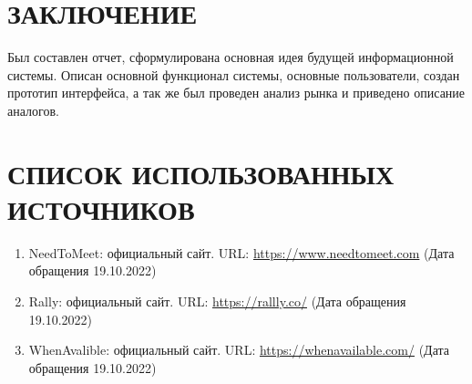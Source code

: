 \documentclass[14pt]{extreport}
\begin{document}
\chapter{ЗАКЛЮЧЕНИЕ \label{chapter3}}
Был составлен отчет, сформулирована основная идея будущей информационной системы. Описан основной функционал системы, основные пользователи, создан прототип интерфейса, а так же был проведен анализ рынка и приведено описание аналогов.
\chapter{СПИСОК ИСПОЛЬЗОВАННЫХ ИСТОЧНИКОВ \label{chapter4}}
\begin{enumerate}
    \item \label{a:NeetToMeet} NeedToMeet: официальный сайт. URL: \url{https://www.needtomeet.com} (Дата обращения 19.10.2022)
    \item \label{b:Rally} Rally: официальный сайт. URL: \url{https://rallly.co/} (Дата обращения 19.10.2022)
    \item \label{c:WhenAvalible} WhenAvalible: официальный сайт. URL: \url{https://whenavailable.com/} (Дата обращения 19.10.2022)
\end{enumerate}
\end{document}
